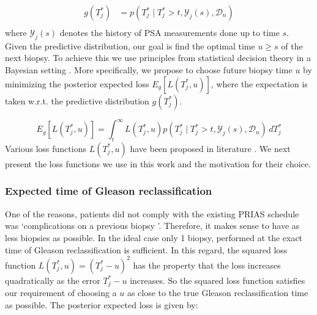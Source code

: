 \begin{equation}
\label{eq : dyn_dist_fail_time}
\begin{split}
g(T^*_j) &= p(T^*_j \mid T^*_j > t, \mathcal{Y}_j(s), \mathcal{D}_n)\\
\end{split}
\end{equation}
where $\mathcal{Y}_j(s)$ denotes the history of PSA measurements done up to time $s$. Given the predictive distribution, our goal is find the optimal time $u \geq s$ of the next biopsy. To achieve this we use principles from statistical decision theory in a Bayesian setting \citep{bergerDecisionTheory,robertBayesianChoice}. More specifically, we propose to choose future biopsy time $u$ by minimizing the posterior expected loss $E_g[L(T^*_j, u)]$, where the expectation is taken w.r.t. the predictive distribution $g(T^*_j)$. 

\begin{equation*}
E_g[L(T^*_j, u)] = \int_t^\infty L(T^*_j, u) p(T^*_j \mid T^*_j > t, \mathcal{Y}_j(s), \mathcal{D}_n) \,dT^*_j
\end{equation*}
Various loss functions $L(T^*_j, u)$ have been proposed in literature \citep{robertBayesianChoice}. We next present the loss functions we use in this work and the motivation for their choice.

\subsubsection{Expected time of Gleason reclassification}
\label{subsubsec : exp_fail_time}
One of the reasons, patients did not comply with the existing PRIAS schedule was \textquoteleft complications on a previous biopsy \textquoteright. Therefore, it makes sense to have as less biopsies as possible. In the ideal case only 1 biopsy, performed at the exact time of Gleason reclassification is sufficient. In this regard, the squared loss function $L(T^*_j, u) = (T^*_j - u)^2$ has the property that the loss increases quadratically as the error $T^*_j - u$ increases. So the squared loss function satisfies our requirement of choosing a $u$ as close to the true Gleason reclassification time as possible. The posterior expected loss is given by:

